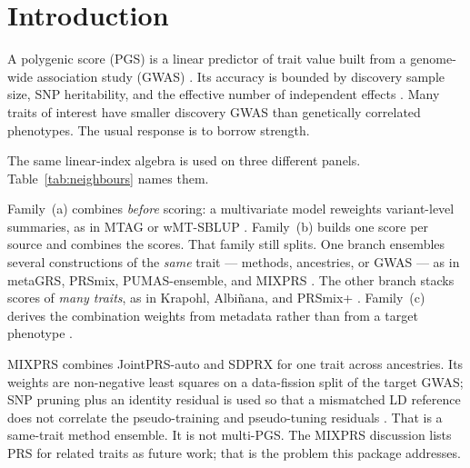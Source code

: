 \documentclass[11pt,a4paper]{article}
\begin{document}
\tableofcontents
\vspace{0.6em}

\section{Introduction}
\label{sec:intro}

A polygenic score (PGS) is a linear predictor of trait value
built from a genome-wide association study (GWAS)
\cite{dudbridge2013,choi2020}. Its accuracy is bounded by
discovery sample size, SNP heritability, and the effective number
of independent effects \cite{daetwyler2008,dudbridge2013}. Many
traits of interest have smaller discovery GWAS than genetically
correlated phenotypes. The usual response is to borrow strength.

The same linear-index algebra is used on three different
panels. Table~\ref{tab:neighbours} names them.

Family~(a) combines \emph{before} scoring: a multivariate model
reweights variant-level summaries, as in MTAG or wMT-SBLUP
\cite{turley2018,maier2018}. Family~(b) builds one score per
source and combines the scores. That family still splits. One
branch ensembles several constructions of the \emph{same} trait
--- methods, ancestries, or GWAS --- as in metaGRS, PRSmix,
PUMAS-ensemble, and MIXPRS
\cite{inouye2018,truong2024,zhao2024,xu2026}. The other branch
stacks scores of \emph{many traits}, as in Krapohl, Albi\~nana,
and PRSmix+ \cite{krapohl2018,albinana2023,truong2024,lambert2021}.
Family~(c) derives the combination weights from metadata rather
than from a target phenotype \cite{maier2018,smith1936,hazel1943}.

MIXPRS combines JointPRS-auto and SDPRX for one trait across
ancestries. Its weights are non-negative least squares on a
data-fission split of the target GWAS; SNP pruning plus an
identity residual is used so that a mismatched LD reference does
not correlate the pseudo-training and pseudo-tuning residuals
\cite{xu2026}. That is a same-trait method ensemble. It is not
multi-PGS. The MIXPRS discussion lists PRS for related traits as
future work; that is the problem this package addresses.
\end{document}
